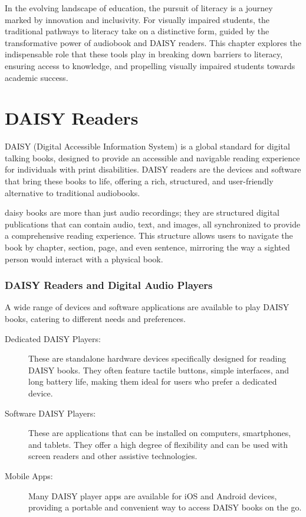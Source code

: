 In the evolving landscape of education, the pursuit of literacy is a journey marked by innovation and inclusivity. For visually impaired students, the traditional pathways to literacy take on a distinctive form, guided by the transformative power of audiobook and DAISY readers. This chapter explores the indispensable role that these tools play in breaking down barriers to literacy, ensuring access to knowledge, and propelling visually impaired students towards academic success.

\section{DAISY Readers}\label{ch7:sec:daisy-readers}

DAISY (Digital Accessible Information System) is a global standard for digital talking books, designed to provide an accessible and navigable reading experience for individuals with print disabilities. DAISY readers are the devices and software that bring these books to life, offering a rich, structured, and user-friendly alternative to traditional audiobooks.

\gls{daisy} books are more than just \gls{audio} recordings; they are structured digital publications that can contain \gls{audio}, text, and images, all synchronized to provide a comprehensive reading experience. This structure allows users to navigate the book by chapter, section, page, and even sentence, mirroring the way a sighted person would interact with a physical book.

\subsubsection{DAISY Readers and Digital Audio Players}

A wide range of devices and \gls{software} applications are available to play DAISY books, catering to different needs and preferences.

\begin{description}
	\item[Dedicated DAISY Players:] These are standalone hardware devices specifically designed for reading DAISY books. They often feature tactile buttons, simple interfaces, and long battery life, making them ideal for users who prefer a dedicated device.
	\item[Software DAISY Players:] These are applications that can be installed on computers, smartphones, and tablets. They offer a high degree of flexibility and can be used with screen readers and other assistive technologies.
	\item[Mobile Apps:] Many DAISY player apps are available for iOS and Android devices, providing a portable and convenient way to access DAISY books on the go.
\end{description}


